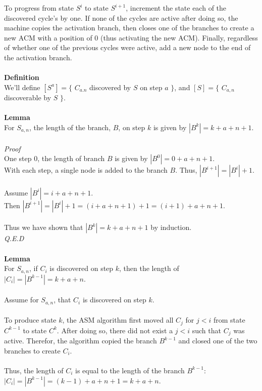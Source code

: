 \documentclass[a4paper,12pt]{article}
\begin{document}
To progress from state $S^i$ to state $S^{i+1}$, increment the state each of the discovered cycle's by one. If none of the cycles are active after doing so, the machine copies the activation branch, then closes one of the branches to create a new ACM with a position of $0$ (thus activating the new ACM). Finally, regardless of whether one of the previous cycles were active, add a new node to the end of the activation branch.\\
\\
\textbf{Definition}\\  
We'll define $[S^a] = \{$ $C_{a.n}$ discovered by $S$ on step $a$ $\}$, and $[S] = \{$ $C_{a,n}$ discoverable by $S$ $\}$.\\
\\
\textbf{Lemma}\\
For $S_{a,n}$, the length of the branch, $B$, on step $k$ is given by $|B^k| = k + a + n + 1$.\\
\\
\textit{Proof}\\  
One step $0$, the length of branch $B$ is given by $|B^0| = 0 + a + n + 1$.\\
With each step, a single node is added to the branch $B$. Thus, $|B^{i+1}| = |B^{i}| + 1$.\\
\\
Assume $|B^{i}| = i + a + n + 1$.\\
Then $|B^{i+1}| = |B^{i}| + 1 = (i + a + n + 1) + 1 = (i + 1) + a + n + 1$.\\
\\
Thus we have shown that $|B^k| = k + a + n + 1$ by induction.\\
\textit{Q.E.D}\\
\\
\textbf{Lemma}\\
For $S_{a,n}$, if $C_i$ is discovered on step $k$, then the length of $|C_i| = |B^{k-1}| = k + a + n$.\\
\\
Assume for $S_{a,n}$, that $C_i$ is discovered on step $k$.\\
\\
To produce state $k$, the ASM algorithm first moved all $C_j$ for $j < i$ from state $C^{k-1}$ to state $C^k$. After doing so, there did not exist a $j < i$ such that $C_j$ was active. Therefor, the algorithm copied the branch $B^{k-1}$ and closed one of the two branches to create $C_i$.\\
\\ 
Thus, the length of $C_i$ is equal to the length of the branch $B^{k-1}$:\\ $|C_i| = |B^{k-1}| = (k - 1) + a + n + 1 = k + a + n$.\\
\end{document}
